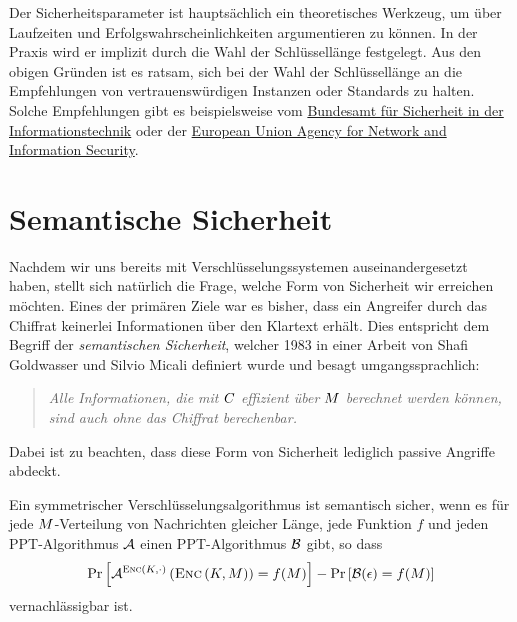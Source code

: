 Der Sicherheitsparameter ist hauptsächlich ein theoretisches Werkzeug, um über Laufzeiten und Erfolgswahrscheinlichkeiten argumentieren zu können. In der Praxis wird er implizit durch die Wahl der Schlüssellänge festgelegt. Aus den obigen Gründen ist es ratsam, sich bei der Wahl der Schlüssellänge an die Empfehlungen von vertrauenswürdigen Instanzen oder Standards zu halten. Solche Empfehlungen gibt es beispielsweise vom \href{https://www.bsi.bund.de/DE/Publikationen/TechnischeRichtlinien/tr02102/index_htm.html}{Bundesamt für Sicherheit in der Informationstechnik} oder der \href{https://www.enisa.europa.eu/activities/identity-and-trust/library/deliverables/algorithms-key-size-and-parameters-report-2014}{European Union Agency for Network and Information Security}.

\section{Semantische Sicherheit}\label{ch:sicherheitsbegriffe:semantischesicherheit}
Nachdem wir uns bereits mit Verschlüsselungssystemen auseinandergesetzt haben, stellt sich natürlich die Frage, welche Form von Sicherheit wir erreichen möchten. 
Eines der primären Ziele war es bisher, dass ein Angreifer durch das Chiffrat keinerlei Informationen über den Klartext erhält. Dies entspricht dem Begriff der \emph{semantischen Sicherheit},
welcher 1983 in einer Arbeit von Shafi Goldwasser und Silvio Micali \cite{Goldwasser1984} definiert wurde und besagt umgangssprachlich:
\begin{quote}
	\emph{Alle Informationen, die mit $C$ effizient über $M$ berechnet werden können, sind auch ohne das Chiffrat berechenbar.}
\end{quote}
Dabei ist zu beachten, dass diese Form von Sicherheit lediglich passive Angriffe abdeckt.

\begin{definition}\label{def:semsec}
Ein symmetrischer Verschlüsselungsalgorithmus ist semantisch sicher, wenn es für jede $M$-Verteilung von Nachrichten gleicher Länge, jede Funktion $f$ und jeden PPT-Algorithmus $\mathcal{A}$ einen PPT-Algorithmus $\mathcal{B}$ gibt, so dass
\begin{align*}
	\text{Pr}\left[ \mathcal{A}^{\textsc{Enc} (K,\cdot)} \left( \textsc{Enc} \left( K, M \right) \right) = f(M) \right] - \text{Pr} \left[ \mathcal{B} (\epsilon) = f (M) \right]
\end{align*}
vernachlässigbar ist.
\end{definition}

